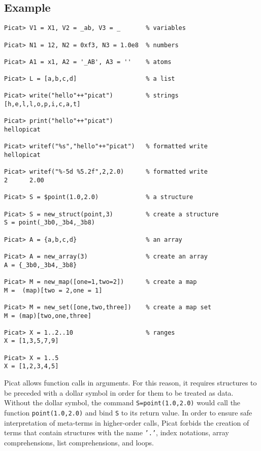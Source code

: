 \subsection*{Example}
\begin{verbatim}
Picat> V1 = X1, V2 = _ab, V3 = _       % variables

Picat> N1 = 12, N2 = 0xf3, N3 = 1.0e8  % numbers

Picat> A1 = x1, A2 = '_AB', A3 = ''    % atoms

Picat> L = [a,b,c,d]                   % a list

Picat> write("hello"++"picat")         % strings
[h,e,l,l,o,p,i,c,a,t]

Picat> print("hello"++"picat")         
hellopicat

Picat> writef("%s","hello"++"picat")   % formatted write
hellopicat

Picat> writef("%-5d %5.2f",2,2.0)      % formatted write
2      2.00

Picat> S = $point(1.0,2.0)             % a structure

Picat> S = new_struct(point,3)         % create a structure   
S = point(_3b0,_3b4,_3b8)

Picat> A = {a,b,c,d}                   % an array

Picat> A = new_array(3)                % create an array
A = {_3b0,_3b4,_3b8}

Picat> M = new_map([one=1,two=2])      % create a map
M =  (map)[two = 2,one = 1]

Picat> M = new_set([one,two,three])    % create a map set
M = (map)[two,one,three]

Picat> X = 1..2..10                    % ranges
X = [1,3,5,7,9]

Picat> X = 1..5
X = [1,2,3,4,5]
\end{verbatim}

Picat allows function calls in arguments. For this reason, it requires structures to be preceded with a dollar symbol in order for them to be treated as data. Without the dollar symbol, the command \texttt{S=point(1.0,2.0)} would call the function \texttt{point(1.0,2.0)} and bind \texttt{S} to its return value. In order to ensure safe interpretation of meta-terms in higher-order calls, Picat forbids the creation of terms that contain structures with the name \texttt{'.'}, index notations, array comprehensions, list comprehensions, and loops.

